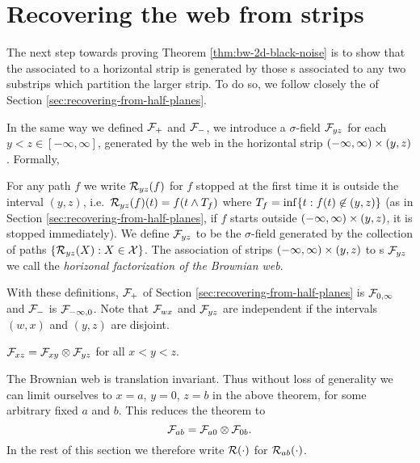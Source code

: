 {
\section{Recovering the web from strips}
\label{sec:recovering-from-strips}

The next step towards proving Theorem \ref{thm:bw-2d-black-noise} is
to show that the \sigfield{} associated to a horizontal strip is
generated by those \sigfield{}s associated to any two substrips
which partition the larger strip.  To do so, we follow closely the
 of Section \ref{sec:recovering-from-half-planes}.

\newcommand{\strip}{(-\infty, \infty) \cross (y,z)}

In the same way we defined $\mathcal{F}_{+}$ and $\mathcal{F}_{-}$,
we introduce a $\sigma$-field $\mathcal{F}_{y z}$ for each $y < z \in
[-\infty, \infty]$, generated by the web in the horizontal strip
$\strip$.  Formally,

\begin{definition}
  \newcommand{\T}{\stripleavetime{f}}
  \label{def:restrict}
  For any path $f$ we write $\mathcal{R}_{{y}{z}}(f)$ for $f$ stopped at
  the first time it is outside the interval $(y,z)$,
  i.e.\ $\restrict{y}{z}{f}(t) = f(t \minsym \T)$ where $\T = \inf\{ t
  : f(t) \not\in (y,z) \}$ (as in Section
  \ref{sec:recovering-from-half-planes}, if $f$ starts
  outside $\strip$, it is stopped immediately).  We define
  $\mathcal{F}_{y z}$ to be the $\sigma$-field generated by the collection
  of paths $\{\mathcal{R}_{{y}{z}}(X) : X \in \mathcal{X} \}$.
  \label{def:horizontal-factorization}
  The association of strips $\strip$ to \sigfield{}s $\mathcal{F}_{y z}$ we call
  the \emph{horizonal factorization of the Brownian web}.
\end{definition}

With these definitions, $\mathcal{F}_{+}$ of Section \ref{sec:recovering-from-half-planes} is
$\mathcal{F}_{0,\infty}$ and $\mathcal{F}_{-}$ is
$\mathcal{F}_{-\infty,0}$.
Note that
  $\mathcal{F}_{w x}$ and $\mathcal{F}_{y z}$ are independent if the
  intervals $(w,x)$ and $(y,z)$ are disjoint.

\renewcommand{\top}{b}
\newcommand{\bottom}{a}

\begin{theorem}\label{thm:recoveringfromstrips}
  $\mathcal{F}_{x z} = \mathcal{F}_{x y} \otimes \mathcal{F}_{y z}$ for all $x < y < z$.
\end{theorem}

The Brownian web is translation invariant.  Thus without loss of
generality we can limit ourselves to $x=a$, $y=0$, $z=b$ in the above
theorem, for some arbitrary fixed $a$ and $b$.  This reduces the theorem to
\[
\mathcal{F}_{a b} = \mathcal{F}_{a 0} \otimes \mathcal{F}_{0 b}.
\]
In the rest of this
section we therefore write $\mathcal{R}(\cdot)$ for
$\restrict{\bottom}{\top}{\cdot}$.

}

